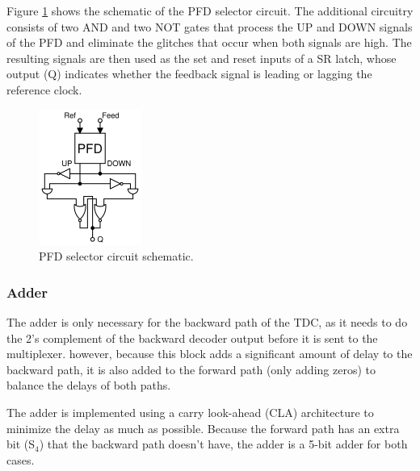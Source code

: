 Figure \ref{fig:PFD_selector} shows the schematic of the PFD selector circuit. The additional circuitry consists of two AND and two NOT gates that process the UP and DOWN signals of the PFD and eliminate the
glitches that occur when both signals are high. The resulting signals are then used as the set and reset inputs of a SR latch, whose output (Q) indicates whether the feedback signal is leading or lagging the
reference clock.

\begin{figure}[H]
    \centering
    \includegraphics[width=0.3\textwidth]{figures/PFD_selector.png}
    \caption{PFD selector circuit schematic.}
    \label{fig:PFD_selector}
\end{figure}

\subsubsection{Adder}
The adder is only necessary for the backward path of the TDC, as it needs to do the 2's complement of the backward decoder output before it is sent to the multiplexer. however, because this block adds a significant 
amount of delay to the backward path, it is also added to the forward path (only adding zeros) to balance the delays of both paths.

The adder is implemented using a carry look-ahead (CLA) architecture to minimize the delay as much as possible. Because the forward path has an extra bit (S$_4$) that the backward path doesn't have, the adder is a
5-bit adder for both cases.

